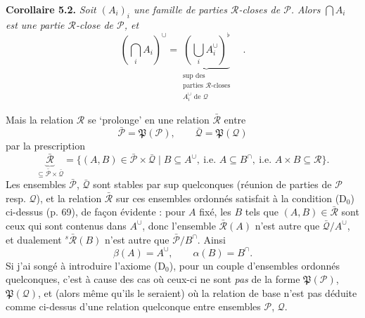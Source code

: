 \documentclass[11pt]{article}
\newcommand{\printedpage}[1]{\marginpar{\footnotesize p.~#1}}
\def\dcprintedpending{}
\newcommand{\msp}[1]{\marginpar{\footnotesize\raggedright
  \ifx\dcprintedpending\empty\else p.~\dcprintedpending\par\fi
  [#1]}\gdef\dcprintedpending{}}
\newcommand{\cP}{\mathcal{P}}
\newcommand{\cQ}{\mathcal{Q}}
\newcommand{\cR}{\mathcal{R}}
\newcommand{\fP}{\mathfrak{P}}
\begin{document}
\textbf{Corollaire 5.2.} \textit{Soit $(A_i)_i$ une famille de parties $\cR$-closes de $\cP$. Alors $\bigcap A_i$ est une partie $\cR$-close de $\cP$, et}
\[
(\bigcap_i A_i)^{\cup} = \underbrace{(\bigcup_i A_i^{\cup})^{\flat}}_{\substack{\text{sup des}\\ \text{parties } \cR\text{-closes}\\ A_i^{\cup} \text{ de } \cQ}} \quad .
\tag*{(5.2.1)}
\]

Mais la relation $\cR$ se `prolonge' en une relation $\bar{\cR}$ entre
\[
\bar{\cP} = \fP(\cP), \qquad \bar{\cQ} = \fP(\cQ)
\tag*{(5.13)}
\]
par la prescription
\[
\underbrace{\bar{\cR}}_{\subseteq \bar{\cP} \times \bar{\cQ}} = \{(A,B) \in \bar{\cP} \times \bar{\cQ} \mid B \subseteq A^{\cup},\ \text{i.e. } A \subseteq B^{\cap},\ \text{i.e. } A \times B \subseteq \cR\}.
\tag*{(5.14)}
\]
Les ensembles $\bar{\cP}$, $\bar{\cQ}$ sont stables par sup quelconques (réunion de parties de $\cP$ resp. $\cQ$), et la relation $\bar{\cR}$ sur ces ensembles ordonnés satisfait à la condition (D$_0$)
\printedpage{46}
\msp{74}
ci-dessus (p. 69), de façon évidente : pour $A$ fixé, les $B$ tels que $(A,B) \in \bar{\cR}$ sont ceux qui sont contenus dans $A^{\cup}$, donc l'ensemble $\bar{\cR}(A)$ n'est autre que $\bar{\cQ}/A^{\cup}$, et dualement ${}^{s}\bar{\cR}(B)$ n'est autre que $\bar{\cP}/B^{\cap}$. Ainsi
\[
\beta(A) = A^{\cup}, \qquad \alpha(B) = B^{\cap}.
\tag*{(5.14)} %
\]
Si j'ai songé à introduire l'axiome (D$_0$), pour un couple d'ensembles ordonnés quelconques, c'est à cause des cas où ceux-ci ne sont \textit{pas} de la forme $\fP(\cP)$, $\fP(\cQ)$, et (alors même qu'ils le seraient) où la relation de base n'est pas déduite comme ci-dessus d'une relation quelconque entre ensembles $\cP$, $\cQ$.
\end{document}

